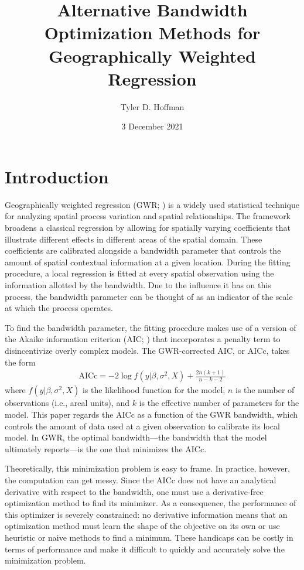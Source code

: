 \documentclass[letterpaper,12pt,twocolumn]{article}
\title{\Large Alternative Bandwidth Optimization Methods for Geographically Weighted Regression}
\author{Tyler D. Hoffman}
\date{3 December 2021}
\begin{document}
\maketitle

\section{Introduction}
\label{sec:introduction}
Geographically weighted regression (GWR; \cite{Fotheringham2003}) is a widely used statistical technique for analyzing spatial process variation and spatial relationships. The framework broadens a classical regression by allowing for spatially varying coefficients that illustrate different effects in different areas of the spatial domain. These coefficients are calibrated alongside a bandwidth parameter that controls the amount of spatial contextual information at a given location. During the fitting procedure, a local regression is fitted at every spatial observation using the information allotted by the bandwidth. Due to the influence it has on this process, the bandwidth parameter can be thought of as an indicator of the scale at which the process operates.

To find the bandwidth parameter, the fitting procedure makes use of a version of the Akaike information criterion (AIC; \cite{Akaike1973}) that incorporates a penalty term to disincentivize overly complex models. The GWR-corrected AIC, or AICc, takes the form \cite{Fotheringham2003} \begin{align*}
    \text{AICc} = -2\log f(y | \beta, \sigma^2, X) + \frac{2n(k+1)}{n-k-2}
\end{align*} where $f(y | \beta, \sigma^2, X)$ is the likelihood function for the model, $n$ is the number of observations (i.e., areal units), and $k$ is the effective number of parameters for the model. This paper regards the AICc as a function of the GWR bandwidth, which controls the amount of data used at a given observation to calibrate its local model. In GWR, the optimal bandwidth---the bandwidth that the model ultimately reports---is the one that minimizes the AICc.

Theoretically, this minimization problem is easy to frame. In practice, however, the computation can get messy. Since the AICc does not have an analytical derivative with respect to the bandwidth, one must use a derivative-free optimization method to find its minimizer. As a consequence, the performance of this optimizer is severely constrained: no derivative information means that an optimization method must learn the shape of the objective on its own or use heuristic or naive methods to find a minimum. These handicaps can be costly in terms of performance and make it difficult to quickly and accurately solve the minimization problem.
\end{document}
